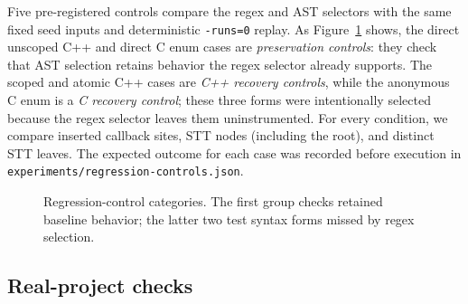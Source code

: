 \documentclass[conference]{IEEEtran}
\begin{document}
Five pre-registered controls compare the regex and AST selectors with the same
fixed seed inputs and deterministic \texttt{-runs=0} replay. As
Figure~\ref{fig:controls} shows, the direct unscoped C++ and direct C enum
cases are \emph{preservation controls}: they check that AST selection retains
behavior the regex selector already supports. The scoped and atomic C++ cases
are \emph{C++ recovery controls}, while the anonymous C enum is a \emph{C
recovery control}; these three forms were intentionally selected because the
regex selector leaves them uninstrumented. For every condition, we compare
inserted callback sites, STT nodes (including the root), and distinct STT
leaves. The expected outcome for each case was recorded before execution in
\texttt{experiments/regression-controls.json}.

\begin{figure}[t]
\centering
{}
\caption{Regression-control categories. The first group checks retained
baseline behavior; the latter two test syntax forms missed by regex selection.}
\label{fig:controls}
\end{figure}

\subsection{Real-project checks}
\end{document}
